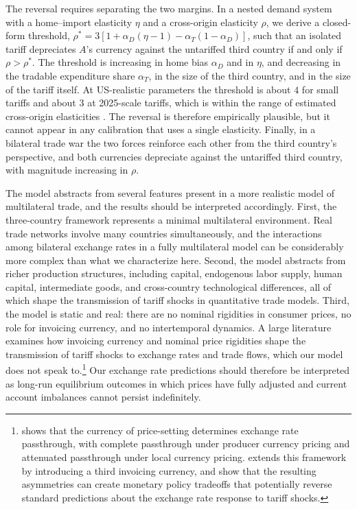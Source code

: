 \documentclass[11pt]{article}
\theoremstyle{plain}
\theoremstyle{remark}
\numberwithin{lemma}{section}
\numberwithin{proposition}{section}
\numberwithin{corollary}{section}
\newenvironment{revblock}{\par\begingroup\color{RevBlue}}{\endgroup\par}
\begin{document}
\begin{revblock}
The reversal requires separating the two margins. In a nested demand system with a home--import elasticity $\eta$ and a cross-origin elasticity $\rho$, we derive a closed-form threshold, $\rho^* = 3\left[1 + \alpha_D(\eta - 1) - \alpha_T(1-\alpha_D)\right]$, such that an isolated tariff depreciates $A$'s currency against the untariffed third country if and only if $\rho > \rho^*$. The threshold is increasing in home bias $\alpha_D$ and in $\eta$, and decreasing in the tradable expenditure share $\alpha_T$, in the size of the third country, and in the size of the tariff itself. At US-realistic parameters the threshold is about $4$ for small tariffs and about $3$ at 2025-scale tariffs, which is within the range of estimated cross-origin elasticities \citep{feenstra2018, broda2006, liqiu2022, fajgelbaum2024trade}. The reversal is therefore empirically plausible, but it cannot appear in any calibration that uses a single elasticity. Finally, in a bilateral trade war the two forces reinforce each other from the third country's perspective, and both currencies depreciate against the untariffed third country, with magnitude increasing in $\rho$.
\end{revblock}

The model abstracts from several features present in a more realistic model of multilateral trade, and the results should be interpreted accordingly. First, the three-country framework represents a minimal multilateral environment. Real trade networks involve many countries simultaneously, and the interactions among bilateral exchange rates in a fully multilateral model can be considerably more complex than what we characterize here. Second, the model abstracts from richer production structures, including capital, endogenous labor supply, human capital, intermediate goods, and cross-country technological differences, all of which shape the transmission of tariff shocks in quantitative trade models. Third, the model is static and real: there are no nominal rigidities in consumer prices, no role for invoicing currency, and no intertemporal dynamics. A large literature examines how invoicing currency and nominal price rigidities shape the transmission of tariff shocks to exchange rates and trade flows, which our model does not speak to.\footnote{\cite{devereux2003monetary} shows that the currency of price-setting determines exchange rate passthrough, with complete passthrough under producer currency pricing and attenuated passthrough under local currency pricing. \cite{gopinath2020dominant} extends this framework by introducing a third invoicing currency, and \cite{bergin2023macroeconomic} show that the resulting asymmetries can create monetary policy tradeoffs that potentially reverse standard predictions about the exchange rate response to tariff shocks.} Our exchange rate predictions should therefore be interpreted as long-run equilibrium outcomes in which prices have fully adjusted and current account imbalances cannot persist indefinitely.
\end{document}
